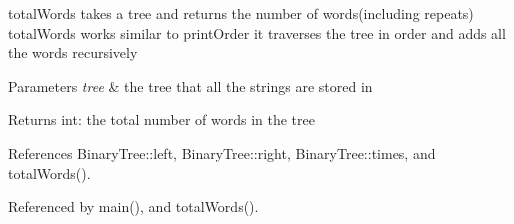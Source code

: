 total\+Words takes a tree and returns the number of words(including repeats) total\+Words works similar to print\+Order it traverses the tree in order and adds all the words recursively 
\begin{DoxyParams}{Parameters}
{\em tree} & the tree that all the strings are stored in \\
\hline
\end{DoxyParams}
\begin{DoxyReturn}{Returns}
int\+: the total number of words in the tree 
\end{DoxyReturn}


References Binary\+Tree\+::left, Binary\+Tree\+::right, Binary\+Tree\+::times, and total\+Words().



Referenced by main(), and total\+Words().

